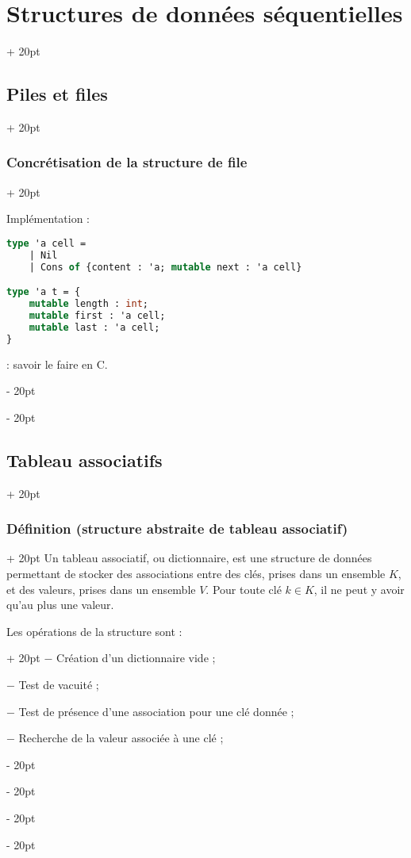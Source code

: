 \documentclass[a4paper, 12pt, twoside]{article}
\newcommand{\ind}[1][20pt]{\advance\leftskip + #1}
\newcommand{\deind}[1][20pt]{\advance\leftskip - #1}
\newenvironment{indt}[2][20pt]{#2 \par \ind[#1]}{\par \deind} %
\begin{document}
\begin{indt}{\section{Structures de données séquentielles}}
\begin{indt}{\subsection{Piles et files}}
\begin{indt}{\subsubsection{Concrétisation de la structure de file}}
                \vspace{6pt}
                
                Implémentation :
                
                \begin{lstlisting}[language=Caml, xleftmargin=80pt]
type 'a cell =
    | Nil
    | Cons of {content : 'a; mutable next : 'a cell}

type 'a t = {
    mutable length : int;
    mutable first : 'a cell;
    mutable last : 'a cell;
}\end{lstlisting}
                
                \vspace{6pt}
                
                 : savoir le faire en C.
            \end{indt}
        \end{indt}
        
        \vspace{12pt}
        
        \begin{indt}{\subsection{Tableau associatifs}}
            \begin{indt}{\subsubsection{Définition (structure abstraite de tableau associatif)}}
                Un tableau associatif, ou dictionnaire, est une structure de données permettant de stocker des associations entre des clés, prises dans un ensemble $K$, et des valeurs, prises dans un ensemble $V$.
                Pour toute clé $k \in K$, il ne peut y avoir qu'au plus une valeur.
                
                \newpage
                
                \begin{indt}{Les opérations de la structure sont :}
                    $-$ Création d'un dictionnaire vide ;
                    
                    $-$ Test de vacuité ;
                    
                    $-$ Test de présence d'une association pour une clé donnée ;
                    
                    $-$ Recherche de la valeur associée à une clé ;
                    

\end{indt}
\end{indt}
\end{indt}
\end{indt}
\end{document}
